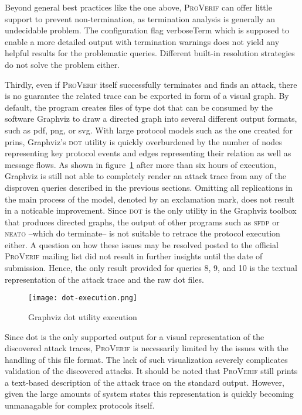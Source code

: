 Beyond general best practices like the one above, \textsc{ProVerif} can offer little support to prevent non-termination, as termination analysis is generally an undecidable problem.
The configuration flag {\sffamily verboseTerm} which is supposed to enable a more detailed output with termination warnings does not yield any helpful results for the problematic queries.
Different built-in resolution strategies do not solve the problem either.\medskip

Thirdly, even if \textsc{ProVerif} itself successfully terminates and finds an attack, there is no guarantee the related trace can be exported in form of a visual graph.
By default, the program creates files of type dot that can be consumed by the software Graphviz to draw a directed graph into several different output formats, such as pdf, png, or svg.
With large protocol models such as the one created for \gls{prins}, Graphviz's \textsc{dot} utility is quickly overburdened by the number of nodes representing key protocol events and edges representing their relation as well as message flows.
As shown in figure~\ref{fig:dot-execution} after more than six hours of execution, Graphviz is still not able to completely render an attack trace from any of the disproven queries described in the previous sections.
Omitting all replications in the main process of the model, denoted by an exclamation mark, does not result in a noticable improvement.
Since \textsc{dot} is the only utility in the Graphviz toolbox that produces directed graphs, the output of other programs such as \textsc{sfdp} or \textsc{neato} --which do terminate-- is not suitable to retrace the protocol execution either.
A question on how these issues may be resolved posted to the official \textsc{ProVerif} mailing list did not result in further insights until the date of submission.
Hence, the only result provided for queries 8, 9, and 10 is the textual representation of the attack trace and the raw dot files.\pagebreak

\begin{figure}[h!]
    \texttt{[image: dot-execution.png]}
    \centering
    \caption{Graphviz dot utility execution}
    \label{fig:dot-execution}
\end{figure}

Since dot is the only supported output for a visual representation of the discovered attack traces, \textsc{ProVerif} is necessarily limited by the issues with the handling of this file format.
The lack of such visualization severely complicates validation of the discovered attacks.
It should be noted that \textsc{ProVerif} still prints a text-based description of the attack trace on the standard output.
However, given the large amounts of system states this representation is quickly becoming unmanagable for complex protocols itself.\medskip

